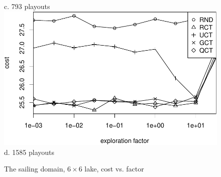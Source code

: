 \documentclass{article}
\begin{document}
\begin{figure}[t]
\begin{minipage}[b]{0.5\linewidth}
    c. 793 playouts\\
    \vspace{1em}
    \includegraphics[scale=0.45]{costs-size=6-nsamples=1585.pdf}\\
    d. 1585 playouts\\
  \end{minipage}
  \caption{The sailing domain, $6\times 6$ lake, cost vs. factor}
  \label{fig:sailing-cost-vs-factor}
\end{figure}
\end{document}
